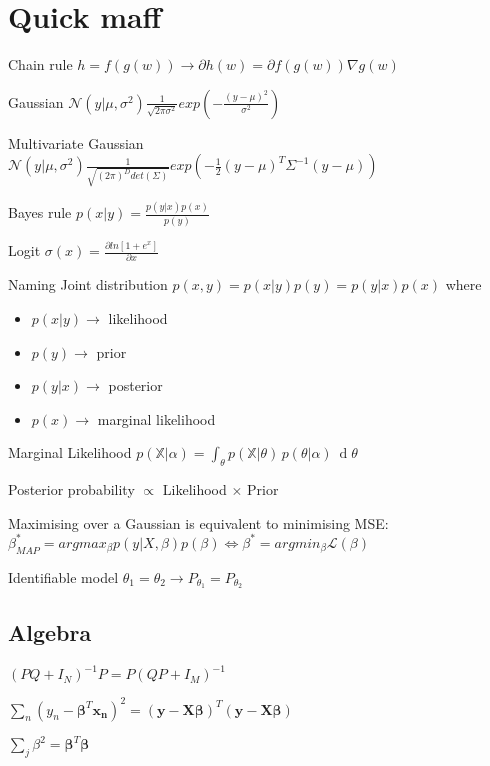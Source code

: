 \section{Quick maff}
Chain rule $h = f(g(w)) \rightarrow \partial h(w) = \partial f(g(w)) \nabla g(w)$

Gaussian $\mathcal{N}(y|\mu, \sigma^2) \frac{1}{\sqrt{2\pi \sigma^2}} exp(-\frac{(y-\mu)^2}{\sigma^2})$

Multivariate Gaussian $\mathcal{N}(y|\mu, \sigma^2) \frac{1}{\sqrt{(2\pi)^D det(\Sigma)}} exp(-\frac{1}{2} (y-\mu)^T \Sigma^{-1} (y-\mu))$

Bayes rule $p(x|y) = \frac{p(y|x) p(x)}{p(y)}$

Logit $\sigma(x) = \frac{\partial ln[1+e^x]}{\partial x}$

Naming
Joint distribution $p(x,y) = p(x|y)p(y)=p(y|x)p(x)$ where
\begin{itemize}
\item $p(x|y) \rightarrow$ likelihood 
\item $p(y) \rightarrow$ prior
\item $p(y|x) \rightarrow$ posterior
\item $p(x) \rightarrow$ marginal likelihood
\end{itemize}

Marginal Likelihood \newline $p({\mathbb  {X}}|\alpha )=\int _{\theta }p({\mathbb  {X}}|\theta )\,p(\theta |\alpha )\ \operatorname {d}\!\theta $

Posterior probability $\propto$ Likelihood $\times$ Prior

Maximising over a Gaussian is equivalent to minimising MSE: $\beta_{MAP}^* = arg max_{\beta} p(y|X,\beta)p(\beta) \Leftrightarrow \beta^* = arg min_{\beta} \mathcal{L}(\beta)$

Identifiable model $\theta_1 = \theta_2 \rightarrow P_{\theta_1} = P_{\theta_2}$

\subsection{Algebra}
$(PQ + I_N)^{-1} P = P (QP + I_M)^{-1}$

$\sum_n (y_{n} -\mathbf{\beta}^T\mathbf{x_n})^2 = (\mathbf{y} - \mathbf{X}\mathbf{\beta})^T(\mathbf{y} - \mathbf{X}\mathbf{\beta})$

$\sum_j \beta^2 = \mathbf{\beta}^T \mathbf{\beta}$